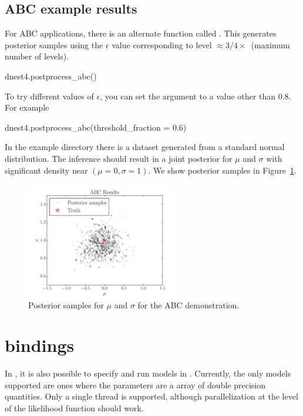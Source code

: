 \documentclass[article]{jss}
\begin{document}
\subsection{ABC example results}
For ABC applications, there is an alternate  function
called .
This generates posterior samples using the $\epsilon$ value corresponding
to level $\approx 3/4\times$~(maximum number of levels).
%
\begin{CodeChunk}
\begin{CodeInput}
dnest4.postprocess_abc()
\end{CodeInput}
\end{CodeChunk}
%
To try different values of $\epsilon$, you can set the argument
 to a value other than 0.8. For example
%
\begin{CodeChunk}
\begin{CodeInput}
dnest4.postprocess_abc(threshold_fraction = 0.6)
\end{CodeInput}
\end{CodeChunk}
%
In the example directory there is a dataset generated from
a standard normal distribution. The inference should
result in a joint posterior for $\mu$ and $\sigma$ with
significant density near $(\mu=0, \sigma=1)$.
We show posterior samples in Figure~\ref{fig:abc_results}.
\begin{figure}[t!]
\centering
\includegraphics[width=0.6\textwidth, trim = 0 5 0 25]{abc_results.pdf}
\caption{Posterior samples for $\mu$ and $\sigma$ for the
ABC demonstration.\label{fig:abc_results}}
\end{figure}

\section[Python bindings]{ bindings}\label{sec:python_bindings}
In , it is also possible to specify and run models in
. Currently, the only models supported
are ones where the parameters
are a  array of double precision quantities.
Only a single thread is supported, although parallelization at
the level of the  likelihood function should work.
\end{document}

